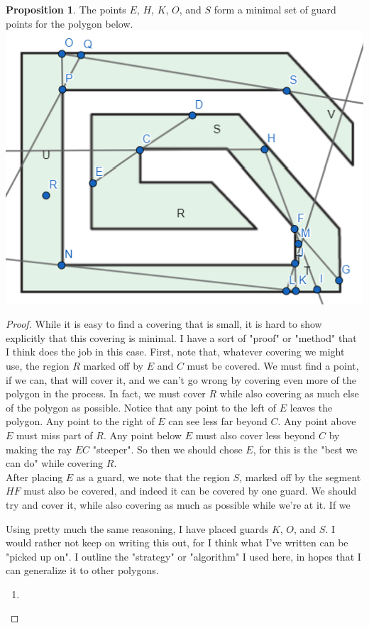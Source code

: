 \documentclass[12pt]{article}
\theoremstyle{definition}
\newtheorem{proposition}{Proposition}
\begin{document}
\begin{proposition} The points $E$, $H$, $K$, $O$, and $S$ form a minimal set of guard points for the polygon below.\\

\includegraphics[scale=1]{minimal_2.png}

\end{proposition}

\begin{proof}
While it is easy to find a covering that is small, it is hard to show explicitly that this covering is minimal. I have a sort of "proof" or "method" that I think does the job in this case. First, note that, whatever covering we might use, the region $R$ marked off by $E$ and $C$ must be covered. We must find a point, if we can, that will cover it, and we can't go wrong by covering even more of the polygon in the process. In fact, we must cover $R$ while also covering as much else of the polygon as possible. Notice that any point to the left of $E$ leaves the polygon. Any point to the right of $E$ can see less far beyond $C$. Any point above $E$ must miss part of $R$. Any point below $E$ must also cover less beyond $C$ by making the ray $EC$ "steeper". So then we should chose $E$, for this is the "best we can do" while covering $R$. \\

After placing $E$ as a guard, we note that the region $S$, marked off by the segment $HF$ must also be covered, and indeed it can be covered by one guard. We should try and cover it, while also covering as much as possible while we're at it. If we

Using pretty much the same reasoning, I have placed guards $K$, $O$, and $S$. I would rather not keep on writing this out, for I think what I've written can be "picked up on". I outline the "strategy" or "algorithm" I used here, in hopes that I can generalize it to other polygons.
\begin{enumerate}
\item
\end{enumerate}

\end{proof}
\end{document}
